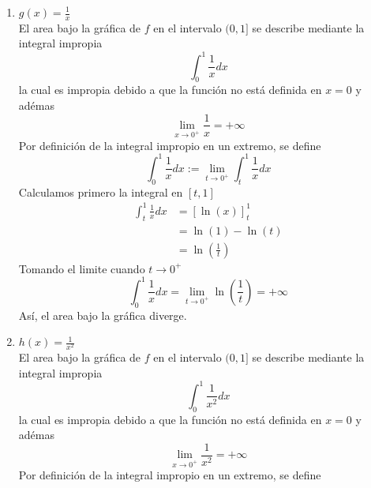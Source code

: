 \documentclass[12pt,a4paper]{article}
\begin{document}
\begin{solucion}
\begin{enumerate}
\begin{enumerate}
                Así, el area bajo la grafica es 2
                \item[2.] $g(x)=\frac1x$\\
                El area bajo la gráfica de $f$ en el intervalo $(0,1]$ se describe mediante la integral impropia
                \begin{equation*}
                    \int_{0}^{1}\frac{1}{x}dx
                \end{equation*}
                la cual es impropia debido a que la función no está definida en $x=0$ y adémas
                \begin{equation*}
                    \lim_{x\to0^{+}}\frac1x=+\infty
                \end{equation*}
                Por definición de la integral impropio en un extremo, se define
                \begin{equation*}
                    \int_{0}^{1}\frac{1}{x}dx:=\lim_{t\to0^{+}}\int_{t}^{1}\frac{1}{x}dx
                \end{equation*}
                Calculamos primero la integral en $[t,1]$
                \begin{align*}
                    \int_{t}^{1}\frac1xdx&=\left[\ln(x)\right]_{t}^{1}\\
                    &=\ln(1)-\ln(t)\\
                    &=\ln(\frac1t)
                \end{align*}
                Tomando el limite cuando $t\to0^{+}$
                \begin{equation*}
                    \int_{0}^{1}\frac{1}{x}dx=\lim_{t\to0^{+}}\ln(\frac{1}{t})=+\infty
                \end{equation*}
                Así, el area bajo la gráfica diverge.
                \item[3.] $h(x)=\frac{1}{x^{2}}$\\
                El area bajo la gráfica de $f$ en el intervalo $(0,1]$ se describe mediante la integral impropia
                \begin{equation*}
                    \int_{0}^{1}\frac{1}{x^{2}}dx
                \end{equation*}
                la cual es impropia debido a que la función no está definida en $x=0$ y adémas
                \begin{equation*}
                    \lim_{x\to0^{+}}\frac{1}{x^{2}}=+\infty
                \end{equation*}
                Por definición de la integral impropio en un extremo, se define

\end{enumerate}
\end{enumerate}
\end{solucion}
\end{document}
